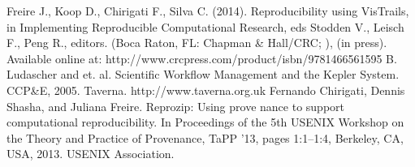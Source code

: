  
%
\begin{singlespace}
\begin{thebibliography}{99}
 Freire J., Koop D., Chirigati F., Silva C. (2014). Reproducibility using VisTrails, in Implementing Reproducible Computational Research, eds Stodden V., Leisch F., Peng R., editors. (Boca Raton, FL: Chapman \& Hall/CRC; ), (in press). Available online at: http://www.crcpress.com/product/isbn/9781466561595 
 B. Ludascher and et. al. Scientific Workflow Management and the Kepler System. CCP\&E, 2005.
 Taverna. http://www.taverna.org.uk
 Fernando Chirigati, Dennis Shasha, and Juliana Freire. Reprozip: Using prove­
nance to support computational reproducibility. In Proceedings of the 5th USENIX Workshop on the Theory and Practice of Provenance, TaPP ’13, pages 1:1–1:4, Berkeley, CA, USA, 2013. USENIX Association.

\end{thebibliography}
\end{singlespace}

